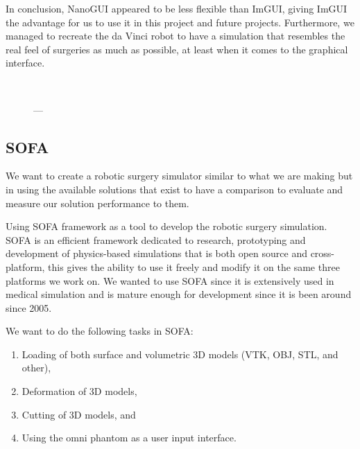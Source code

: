 \begin{center}
  \setlength{\fboxsep}{0pt}%
  \setlength{\fboxrule}{0.1pt}%
\end{center}

In conclusion, NanoGUI appeared to be less flexible than ImGUI, giving ImGUI the advantage for us to use it in this project and future projects. Furthermore, we managed to recreate the da Vinci robot  to have a simulation that resembles the real feel of surgeries as much as possible, at least when it comes to the graphical interface.

\begin{figure}
  \centering%
  \setlength{\fboxsep}{0pt}%
  \setlength{\fboxrule}{0.1pt}%
  \\[1ex]
  \caption{---}
  \label{fig:}
\end{figure}



\subsection{SOFA}
\label{sec:sofa}
We want to create a robotic surgery simulator similar to what we are making but in using the available solutions that exist to have a comparison to evaluate and measure our solution performance to them.

Using SOFA framework as a tool to develop the robotic surgery simulation. SOFA is an efficient framework dedicated to research, prototyping and development of physics-based simulations that is both open source and cross-platform, this gives the ability to use it freely and modify it on the same three platforms we work on. We wanted to use SOFA since it is extensively used in medical simulation and is mature enough for development since it is been around since 2005.

We want to do the following tasks in SOFA:
\begin{enumerate}[1.]
  \item Loading of both surface and volumetric 3D models (VTK, OBJ, STL, and other),
  \item Deformation of 3D models,
  \item Cutting of 3D models, and
  \item Using the omni phantom as a user input interface.
\end{enumerate}

